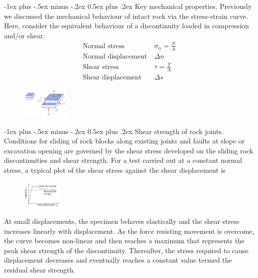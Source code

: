 \documentclass[10pt,landscape,a4paper]{article}
\makeatletter
\renewcommand{\section}{\@startsection{section}{1}{0mm}%
	{-1ex plus -.5ex minus -.2ex}%
	{0.5ex plus .2ex}%
	{\normalfont\large\bfseries}}
\makeatother
\begin{document}
\begin{multicols}{3}
	\section{Key mechanical properties.}
	Previously we discussed the mechanical behaviour of intact rock via the stress-strain curve.
	Here, consider the equivalent behaviour of a discontinuity loaded in compression and/or shear.
	\begin{align*}
		\text{Normal stress}\        & \sigma_n=\frac{N}{A} \\
		\text{Normal displacement}\  & \Delta n             \\
		\text{Shear stress}\         & \tau=\frac{T}{A}     \\
		\text{Shear displacement}\   & \Delta s
	\end{align*}
	\begin{figure}[H]
		\centering
		\includegraphics[width=0.2\textwidth]{direct-shear-test}
	\end{figure}
	
	\section{Shear strength of rock joints.}
	Conditions for sliding of rock blocks along existing joints and faults at slope or excavation opening are governed by the shear stress developed on the sliding rock discontinuities and shear strength.
	For a test carried out at a constant normal stress, a typical plot of the shear stress against the shear displacement is
	\begin{figure}[H]
		\centering
		\includegraphics[width=0.17\textwidth]{shear-stress-displacement}
	\end{figure}
	At small displacements, the specimen behaves elastically and the shear stress increases linearly with displacement.
	As the force resisting movement is overcome, the curve becomes non-linear and then reaches a maximum that represents the peak shear strength of the discontinuity.
	Thereafter, the stress required to cause displacement decreases and eventually reaches a constant value termed the residual shear strength.
	

\end{multicols}
\end{document}
